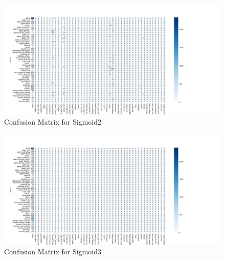 \documentclass[conference]{IEEEtran}
\begin{document}
\begin{figure}[h!]
    \centering
    \includegraphics[width=\linewidth]{sigmoid2}
    \caption{Confusion Matrix for Sigmoid2}
\end{figure}

\begin{figure}[h!]
    \centering
    \includegraphics[width=\linewidth]{sigmoid3}
    \caption{Confusion Matrix for Sigmoid3}
\end{figure}
\end{document}
